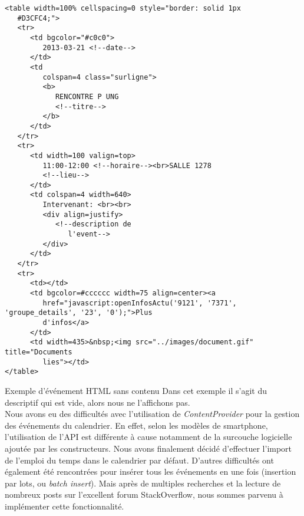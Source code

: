 \begin{adjustbox}{minipage=1.14\textwidth,margin=0pt \smallskipamount,center}
\begin{lstlisting}[style=HTML, label=htmlCode]
<table width=100% cellspacing=0 style="border: solid 1px 
   #D3CFC4;">
   <tr>
      <td bgcolor="#c0c0">
         2013-03-21 <!--date-->
      </td>
      <td
         colspan=4 class="surligne">
         <b>
            RENCONTRE P UNG
            <!--titre-->
         </b>
      </td>
   </tr>
   <tr>
      <td width=100 valign=top>
         11:00-12:00 <!--horaire--><br>SALLE 1278
         <!--lieu-->
      </td>
      <td colspan=4 width=640>
         Intervenant: <br><br>
         <div align=justify>
            <!--description de
               l'event-->
         </div>
      </td>
   </tr>
   <tr>
      <td></td>
      <td bgcolor=#cccccc width=75 align=center><a
         href="javascript:openInfosActu('9121', '7371', 'groupe_details', '23', '0');">Plus
         d'infos</a>
      </td>
      <td width=435>&nbsp;<img src="../images/document.gif" title="Documents 
         lies"></td>
</table>
\end{lstlisting}
\end{adjustbox}

Exemple d'événement HTML sans contenu
Dans cet exemple il s'agit du descriptif qui est vide, alors nous ne l'affichons pas. \\

Nous avons eu des difficultés avec l’utilisation de \emph{ContentProvider} pour la gestion des événements du calendrier. En effet, selon les modèles de smartphone, l’utilisation de l’API est différente à cause notamment de la surcouche logicielle ajoutée par les constructeurs. Nous avons finalement décidé d’effectuer l’import de l’emploi du temps dans le calendrier par défaut. D’autres difficultés ont également été rencontrées pour insérer tous les événements en une fois (insertion par lots, ou \emph{batch insert}). Mais après de multiples recherches et la lecture de nombreux posts sur l’excellent forum StackOverflow, nous sommes parvenu à implémenter cette fonctionnalité.

